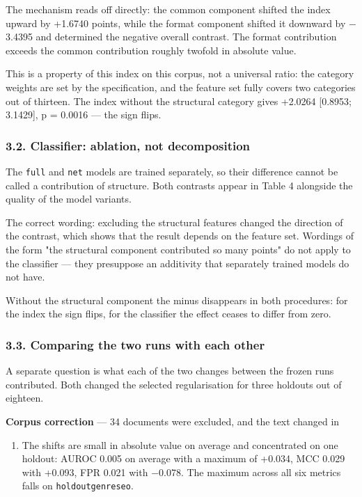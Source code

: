 \documentclass[11pt,a4paper]{article}
\renewcommand{\_}{\textunderscore\allowbreak}
\begin{document}
The mechanism reads off directly: the common component shifted the index
upward by +1.6740 points, while the format component shifted it downward by
$-$3.4395 and determined the negative overall contrast. The format contribution
exceeds the common contribution roughly twofold in absolute value.

This is a property of this index on this corpus, not a universal ratio: the
category weights are set by the specification, and the feature set fully
covers two categories out of thirteen. The index without the structural
category gives +2.0264 [0.8953; 3.1429], p = 0.0016 — the sign flips.

\subsubsection{3.2. Classifier: ablation, not decomposition}

The \texttt{full} and \texttt{net} models are trained separately, so their difference cannot
be called a contribution of structure. Both contrasts appear in Table 4
alongside the quality of the model variants.

\setcounter{table}{3}


The correct wording: excluding the structural features changed the direction
of the contrast, which shows that the result depends on the feature set.
Wordings of the form "the structural component contributed so many points" do
not apply to the classifier — they presuppose an additivity that separately
trained models do not have.

Without the structural component the minus disappears in both procedures: for
the index the sign flips, for the classifier the effect ceases to differ from
zero.

\subsubsection{3.3. Comparing the two runs with each other}

A separate question is what each of the two changes between the frozen runs
contributed. Both changed the selected regularisation for three holdouts out
of eighteen.

\textbf{Corpus correction} — 34 documents were excluded, and the text changed in

\begin{enumerate}
\item[68.] The shifts are small in absolute value on average and concentrated on one
holdout: AUROC 0.005 on average with a maximum of +0.034, MCC 0.029 with
+0.093, FPR 0.021 with $-$0.078. The maximum across all six metrics falls on
\texttt{holdout\_genre\_seo}.
\end{enumerate}
\end{document}
